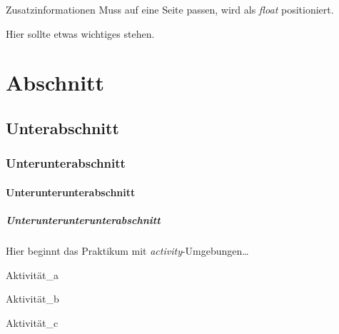 \lipsum[1-4] 



\begin{varexcursus}{Zusatzinformationen}
    Muss auf eine Seite passen, wird als \textit{float} positioniert.
    \par\lipsum[1-2]
\end{varexcursus}

\lipsum[8-10]
\lipsum[11-12]

\begin{varremark}
    Hier sollte etwas wichtiges stehen.
\end{varremark}
\section{Abschnitt}
\lipsum[13]
\subsection{Unterabschnitt}
\lipsum[14]
\subsubsection{Unterunterabschnitt}
\lipsum[15]
\paragraph{Unterunterunterabschnitt}
\lipsum[16]
\subparagraph{Unterunterunterunterabschnitt}
\lipsum[17]

\varactivitiessection
Hier beginnt das Praktikum mit \textit{activity}-Umgebungen\dots

\lipsum[17]

\begin{varactivity}{Aktivität\_a}
    \lipsum[18-19]
\end{varactivity}

\begin{varactivity}{Aktivität\_b}
    \lipsum[20]
\end{varactivity}

\lipsum[20]

\begin{varactivity}{Aktivität\_c}
    \lipsum[22]
\end{varactivity}
